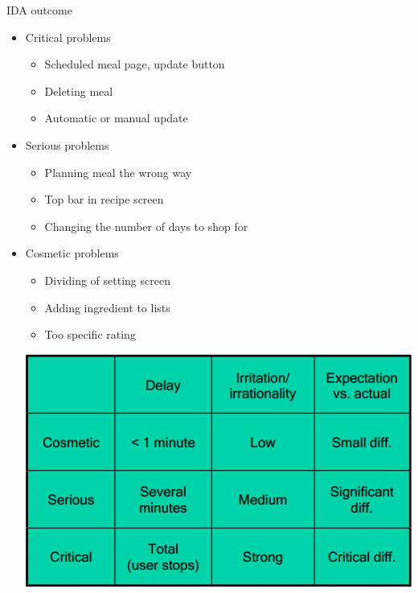 \begin{frame}{IDA outcome}
    \begin{itemize}
	\item Critical problems
		\begin{itemize}
			\item Scheduled meal page, update button
			\item Deleting meal
			\item Automatic or manual update
		\end{itemize}
	\item Serious problems
		\begin{itemize}
			\item Planning meal the wrong way
			\item Top bar in recipe screen
			\item Changing the number of days to shop for 
		\end{itemize}
	\item Cosmetic problems
		\begin{itemize}
			\item Dividing of setting screen
			\item Adding ingredient to lists
			\item Too specific rating
		\end{itemize}
        \includegraphics[scale=0.3]{./graphics/UsabilityTest_Screenshot04}
    \end{itemize}
\end{frame}

